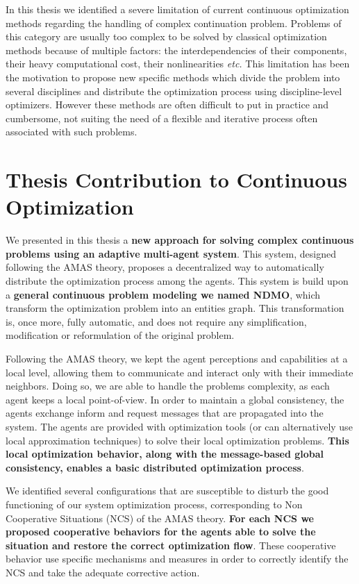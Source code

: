 
In this thesis we identified a severe limitation of current continuous optimization methods regarding the handling of complex continuation problem. Problems of this category are usually too complex to be solved by classical optimization methods because of multiple factors: the interdependencies of their components, their heavy computational cost, their nonlinearities \emph{etc.} This limitation has been the motivation to propose new specific methods which divide the problem into several disciplines and distribute the optimization process using discipline-level optimizers. However these methods are often difficult to put in practice and cumbersome, not suiting the need of a flexible and iterative process often associated with such problems.

\section*{Thesis Contribution to Continuous Optimization}

We presented in this thesis a \textbf{new approach for solving complex continuous problems using an adaptive multi-agent system}. This system, designed following the AMAS theory, proposes a decentralized way to automatically distribute the optimization process among the agents. This system is build upon a \textbf{general continuous problem modeling we named NDMO}, which transform the optimization problem into an entities graph. This transformation is, once more, fully automatic, and does not require any simplification, modification or reformulation of the original problem.

Following the AMAS theory, we kept the agent perceptions and capabilities at a local level, allowing them to communicate and interact only with their immediate neighbors. Doing so, we are able to handle the problems complexity, as each agent keeps a local point-of-view. In order to maintain a global consistency, the agents exchange inform and request messages that are propagated into the system. The agents are provided with optimization tools (or can alternatively use local approximation techniques) to solve their local optimization problems. \textbf{This local optimization behavior, along with the message-based global consistency, enables a basic distributed optimization process}.

We identified several configurations that are susceptible to disturb the good functioning of our system optimization process, corresponding to Non Cooperative Situations (NCS) of the AMAS theory. \textbf{For each NCS we proposed cooperative behaviors for the agents able to solve the situation and restore the correct optimization flow}. These cooperative behavior use specific mechanisms and measures in order to correctly identify the NCS and take the adequate corrective action.

